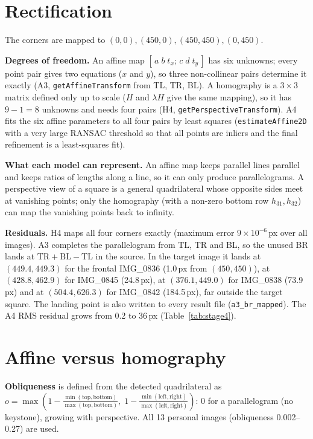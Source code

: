 \documentclass[conference]{IEEEtran}%
\begin{document}
\section{Rectification}
The corners are mapped to $(0,0),(450,0),(450,450),(0,450)$.

\textbf{Degrees of freedom.} An affine map $[\,a\;b\;t_x;\,c\;d\;t_y\,]$ has
six unknowns; every point pair gives two equations ($x$ and $y$), so three
non-collinear pairs determine it exactly (A3, \texttt{getAffineTransform}
from TL, TR, BL). A homography is a $3\times3$ matrix defined only up to
scale ($H$ and $\lambda H$ give the same mapping), so it has $9-1=8$ unknowns
and needs four pairs (H4, \texttt{getPerspectiveTransform}). A4 fits the
six affine parameters to all four pairs by least squares
(\texttt{estimateAffine2D} with a very large RANSAC threshold so that all
points are inliers and the final refinement is a least-squares fit).

\textbf{What each model can represent.} An affine map keeps parallel lines
parallel and keeps ratios of lengths along a line, so it can only produce
parallelograms. A perspective view of a square is a general quadrilateral
whose opposite sides meet at vanishing points; only the homography (with a
non-zero bottom row $h_{31},h_{32}$) can map the vanishing points back to
infinity.

\textbf{Residuals.} H4 maps all four corners exactly (maximum error
$9\times10^{-6}$\,px over all images). A3 completes the parallelogram from
TL, TR and BL, so the unused BR lands at
$\mathrm{TR}+\mathrm{BL}-\mathrm{TL}$ in the source. In the target image
it lands at $(449.4, 449.3)$ for the frontal IMG\_0836 (1.0\,px from
$(450,450)$), at $(428.8, 462.9)$ for IMG\_0845 (24.8\,px), at
$(376.1, 449.0)$ for IMG\_0838 (73.9\,px) and at $(504.4, 626.3)$ for
IMG\_0842 (184.5\,px), far outside the target square. The landing point is
also written to every result file (\texttt{a3\_br\_mapped}). The A4 RMS residual grows from
0.2 to 36\,px (Table~\ref{tab:stage4}).

\section{Affine versus homography}
\textbf{Obliqueness} is defined from the detected quadrilateral as
$o=\max(1-\tfrac{\min(\text{top},\text{bottom})}{\max(\text{top},\text{bottom})},\;
1-\tfrac{\min(\text{left},\text{right})}{\max(\text{left},\text{right})})$:
0 for a parallelogram (no keystone), growing with perspective.
All 13 personal images (obliqueness 0.002--0.27) are used.
\end{document}
